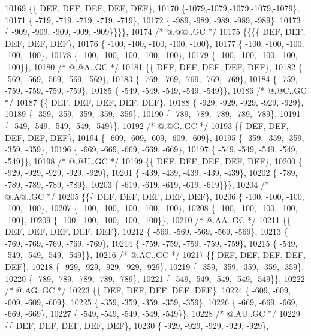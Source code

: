 \begin{DoxyCode}
10169 \{\{  DEF,  DEF,  DEF,  DEF,  DEF\},
10170 \{-1079,-1079,-1079,-1079,-1079\},
10171 \{ -719, -719, -719, -719, -719\},
10172 \{ -989, -989, -989, -989, -989\},
10173 \{ -909, -909, -909, -909, -909\}\}\}\},
10174 \textcolor{comment}{/*  @.@@..GC */}
10175 \{\{\{\{  DEF,  DEF,  DEF,  DEF,  DEF\},
10176 \{ -100, -100, -100, -100, -100\},
10177 \{ -100, -100, -100, -100, -100\},
10178 \{ -100, -100, -100, -100, -100\},
10179 \{ -100, -100, -100, -100, -100\}\},
10180 \textcolor{comment}{/*  @.@A..GC */}
10181 \{\{  DEF,  DEF,  DEF,  DEF,  DEF\},
10182 \{ -569, -569, -569, -569, -569\},
10183 \{ -769, -769, -769, -769, -769\},
10184 \{ -759, -759, -759, -759, -759\},
10185 \{ -549, -549, -549, -549, -549\}\},
10186 \textcolor{comment}{/*  @.@C..GC */}
10187 \{\{  DEF,  DEF,  DEF,  DEF,  DEF\},
10188 \{ -929, -929, -929, -929, -929\},
10189 \{ -359, -359, -359, -359, -359\},
10190 \{ -789, -789, -789, -789, -789\},
10191 \{ -549, -549, -549, -549, -549\}\},
10192 \textcolor{comment}{/*  @.@G..GC */}
10193 \{\{  DEF,  DEF,  DEF,  DEF,  DEF\},
10194 \{ -609, -609, -609, -609, -609\},
10195 \{ -359, -359, -359, -359, -359\},
10196 \{ -669, -669, -669, -669, -669\},
10197 \{ -549, -549, -549, -549, -549\}\},
10198 \textcolor{comment}{/*  @.@U..GC */}
10199 \{\{  DEF,  DEF,  DEF,  DEF,  DEF\},
10200 \{ -929, -929, -929, -929, -929\},
10201 \{ -439, -439, -439, -439, -439\},
10202 \{ -789, -789, -789, -789, -789\},
10203 \{ -619, -619, -619, -619, -619\}\}\},
10204 \textcolor{comment}{/*  @.A@..GC */}
10205 \{\{\{  DEF,  DEF,  DEF,  DEF,  DEF\},
10206 \{ -100, -100, -100, -100, -100\},
10207 \{ -100, -100, -100, -100, -100\},
10208 \{ -100, -100, -100, -100, -100\},
10209 \{ -100, -100, -100, -100, -100\}\},
10210 \textcolor{comment}{/*  @.AA..GC */}
10211 \{\{  DEF,  DEF,  DEF,  DEF,  DEF\},
10212 \{ -569, -569, -569, -569, -569\},
10213 \{ -769, -769, -769, -769, -769\},
10214 \{ -759, -759, -759, -759, -759\},
10215 \{ -549, -549, -549, -549, -549\}\},
10216 \textcolor{comment}{/*  @.AC..GC */}
10217 \{\{  DEF,  DEF,  DEF,  DEF,  DEF\},
10218 \{ -929, -929, -929, -929, -929\},
10219 \{ -359, -359, -359, -359, -359\},
10220 \{ -789, -789, -789, -789, -789\},
10221 \{ -549, -549, -549, -549, -549\}\},
10222 \textcolor{comment}{/*  @.AG..GC */}
10223 \{\{  DEF,  DEF,  DEF,  DEF,  DEF\},
10224 \{ -609, -609, -609, -609, -609\},
10225 \{ -359, -359, -359, -359, -359\},
10226 \{ -669, -669, -669, -669, -669\},
10227 \{ -549, -549, -549, -549, -549\}\},
10228 \textcolor{comment}{/*  @.AU..GC */}
10229 \{\{  DEF,  DEF,  DEF,  DEF,  DEF\},
10230 \{ -929, -929, -929, -929, -929\},

\end{DoxyCode}
